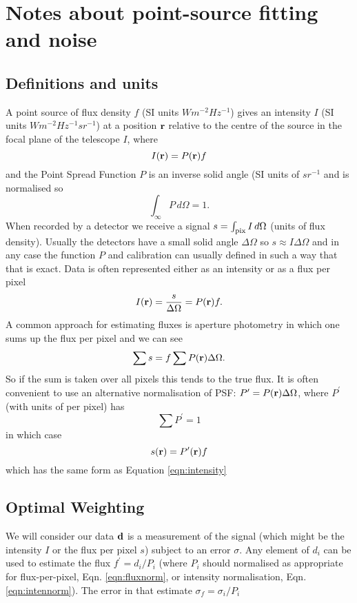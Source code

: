 \documentclass{article}
\begin{document}
\section{Notes about point-source fitting and noise}
\subsection{Definitions and units}
A point source of flux density $f$ (SI units $Wm^{-2}Hz^{-1}$) gives an intensity $I$  (SI units $Wm^{-2}Hz^{-1}sr^{-1}$) at a position ${\bf r}$ relative to the centre of the source in the focal plane of the telescope $I$, where 
\begin{equation} I({\bf r})=P({\bf r})f \label{eqn:intensity}\end{equation} and the Point Spread Function $P$ is an inverse solid angle (SI units of $sr^{-1}$ and is normalised so 
\begin{equation}\int_\infty P\, d\Omega=1.\label{eqn:intennorm}\end{equation}
When recorded by a detector we receive a signal  $s=\int_{\rm pix}{I}\,d\Omega$ (units of flux density). Usually the detectors have a small solid angle $\Delta\Omega$ so $s\approx I\Delta\Omega$ and in any case the function $P$ and calibration can usually defined in such a way that that is exact.  Data is often represented either as an intensity or as a flux per pixel
 \begin{equation}
I({\bf r})=\frac{s}{\Delta{\Omega}}=P({\bf r})f.
\end{equation}
A common approach for estimating fluxes is aperture photometry in which one sums up the flux per pixel and we can see
 \begin{equation}
 \sum{s}=f\sum{P({\bf r})\Delta{\Omega}}.
\end{equation}
So if the sum is taken over all pixels this tends to the true flux.  It is often convenient to use an alternative normalisation of PSF:
$P^\prime=P({\bf r})\Delta{\Omega}$, where $P^\prime$ (with units of per pixel) has
\begin{equation}\sum P^\prime=1\label{eqn:fluxnorm}\end{equation} in which case 
\begin{equation}s({\bf r})=P^\prime({\bf r}) f\label{eqn:pix}\end{equation}
which has the same form as Equation \ref{eqn:intensity}

\subsection{Optimal Weighting}
We will consider our data ${\bf d}$ is a measurement of the signal (which might be the intensity $I$ or the flux per pixel $s$) subject to an error $\sigma$.  Any element of $d_i$ can be used to estimate the flux $f^\prime=d_i/P_i$ (where $P_i$ should normalised as appropriate for flux-per-pixel, Eqn. \ref{eqn:fluxnorm}, or intensity normalisation, Eqn. \ref{eqn:intennorm}).  The error in that estimate $\sigma_f=\sigma_i/P_i$
\end{document}
